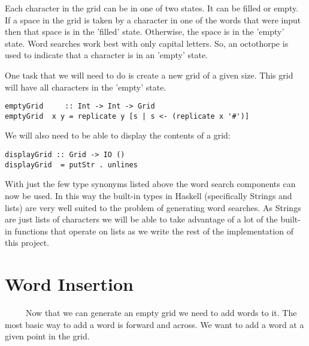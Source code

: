 \documentclass[12pt]{report}   %
\begin{document}
    \vspace{12pt}

    Each character in the grid can be in one of two states. It can be filled or
    empty. If a space in the grid is taken by a character in one of the words
    that were input then that space is in the 'filled' state. Otherwise, the
    space is in the 'empty' state. Word searches work best with only capital
    letters. So, an octothorpe is used to indicate that a character is in
    an 'empty' state.

    \vspace{12pt}

    One task that we will need to do is create a new grid of a given size. This
    grid will have all characters in the 'empty' state.

    \vspace{12pt}

    \begin{lstlisting}
emptyGrid     :: Int -> Int -> Grid
emptyGrid  x y = replicate y [s | s <- (replicate x '#')] 
    \end{lstlisting}

    \vspace{12pt}

    We will also need to be able to display the contents of a grid:

    \vspace{12pt}

    \begin{lstlisting}
displayGrid :: Grid -> IO ()
displayGrid  = putStr . unlines
    \end{lstlisting}

    \vspace{12pt}

    With just the few type synonyms listed above the word search components can
    now be used. In this way the built-in types in Haskell (specifically
    Strings and lists) are very well suited to the problem of generating word
    searches. As Strings are just lists of characters we will be able to take
    advantage of a lot of the built-in functions that operate on lists as we
    write the rest of the implementation of this project.

\section*{Word Insertion}
    \ \ \ \ \ Now that we can generate an empty grid we need to add words to
    it. The most basic way to add a word is forward and across. We want to add
    a word at a given point in the grid.
\end{document}
